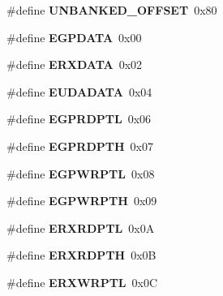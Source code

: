 \begin{DoxyCompactItemize}
\item 
\mbox{\label{group___special_ga1bb57742c49c9baeab79d2fdacd942ce}} 
\#define {\bfseries U\+N\+B\+A\+N\+K\+E\+D\+\_\+\+O\+F\+F\+S\+ET}~0x80
\item 
\mbox{\label{group___special_gaebc9eb7f0ff315389dd12d432687bc19}} 
\#define {\bfseries E\+G\+P\+D\+A\+TA}~0x00
\item 
\mbox{\label{group___special_ga8c5417139f09a6c6e76b6f36d7b215ce}} 
\#define {\bfseries E\+R\+X\+D\+A\+TA}~0x02
\item 
\mbox{\label{group___special_ga53f36c25d1efcb777c5e33d984721955}} 
\#define {\bfseries E\+U\+D\+A\+D\+A\+TA}~0x04
\item 
\mbox{\label{group___special_ga06f3e79e9e86fde4dd7793cc864c1d66}} 
\#define {\bfseries E\+G\+P\+R\+D\+P\+TL}~0x06
\item 
\mbox{\label{group___special_gab8aec06db17276a345f947275bd7fe68}} 
\#define {\bfseries E\+G\+P\+R\+D\+P\+TH}~0x07
\item 
\mbox{\label{group___special_ga66d2859746d6c90f180f2c1266c9ffec}} 
\#define {\bfseries E\+G\+P\+W\+R\+P\+TL}~0x08
\item 
\mbox{\label{group___special_ga4d30fe6f7033235fd0afbbb198fb3620}} 
\#define {\bfseries E\+G\+P\+W\+R\+P\+TH}~0x09
\item 
\mbox{\label{group___special_ga0e4345b59cc531bd8daee2cd8c8e906b}} 
\#define {\bfseries E\+R\+X\+R\+D\+P\+TL}~0x0A
\item 
\mbox{\label{group___special_ga1668b845f0bc37dbb515c2358357a690}} 
\#define {\bfseries E\+R\+X\+R\+D\+P\+TH}~0x0B
\item 
\mbox{\label{group___special_ga7d78e648da085c6fdf006d75b3c99a7a}} 
\#define {\bfseries E\+R\+X\+W\+R\+P\+TL}~0x0C
\item 

\end{DoxyCompactItemize}
